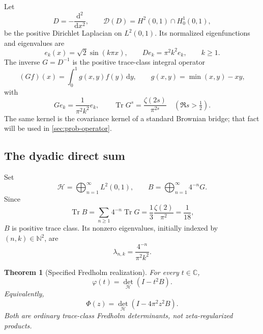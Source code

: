 \documentclass[11pt,oneside]{article}
\newtheorem{theorem}{Theorem}[section]
\theoremstyle{definition}
\newcommand{\dd}{\,\mathrm d}
\newcommand{\C}{\mathbb C}
\newcommand{\N}{\mathbb N}
\newcommand{\Tr}{\operatorname{Tr}}
\newcommand{\PhiF}{\Phi}
\newcommand{\phiF}{\varphi}
\begin{document}
Let
\begin{equation}
 D=-\frac{\mathrm d^2}{\mathrm dx^2},
 \qquad
 \mathcal D(D)=H^2(0,1)\cap H_0^1(0,1),
 \label{eq:Dirichlet-D}
\end{equation}
be the positive Dirichlet Laplacian on \(L^2(0,1)\).  Its normalized eigenfunctions and
eigenvalues are
\begin{equation}
 e_k(x)=\sqrt2\sin(k\pi x),
 \qquad
 De_k=\pi^2k^2e_k,
 \qquad k\ge1.
 \label{eq:D-spectrum}
\end{equation}
The inverse \(G=D^{-1}\) is the positive trace-class integral operator
\begin{equation}
 (Gf)(x)=\int_0^1g(x,y)f(y)\dd y,
 \qquad
 g(x,y)=\min(x,y)-xy,
 \label{eq:Green-kernel}
\end{equation}
with
\begin{equation}
 Ge_k=\frac1{\pi^2k^2}e_k,
 \qquad
 \Tr G^s=\frac{\zeta(2s)}{\pi^{2s}}
 \quad(\Re s>\tfrac12).
 \label{eq:G-zeta}
\end{equation}
The same kernel is the covariance kernel of a standard Brownian bridge; that fact will
be used in \cref{sec:prob-operator}.

\subsection{The dyadic direct sum}

Set
\begin{equation}
 \mathscr H=\bigoplus_{n=1}^{\infty}L^2(0,1),
 \qquad
 B=\bigoplus_{n=1}^{\infty}4^{-n}G.
 \label{eq:B-definition}
\end{equation}
Since
\begin{equation}
 \Tr B=\sum_{n\ge1}4^{-n}\Tr G
 =\frac13\frac{\zeta(2)}{\pi^2}=\frac1{18},
 \label{eq:B-trace}
\end{equation}
\(B\) is positive trace class.  Its nonzero eigenvalues, initially indexed by
\((n,k)\in\N^2\), are
\begin{equation}
 \lambda_{n,k}=\frac{4^{-n}}{\pi^2k^2}.
 \label{eq:B-double-spectrum}
\end{equation}

\begin{theorem}[Specified Fredholm realization]
\label{thm:Fredholm}
For every \(t\in\C\),
\begin{equation}
 \boxed{\quad
 \phiF(t)=\det_{\mathscr H}(I-t^2B).
 \quad}
 \label{eq:Fredholm-phi}
\end{equation}
Equivalently,
\begin{equation}
 \PhiF(z)=\det_{\mathscr H}(I-4\pi^2z^2B).
 \label{eq:Fredholm-Phi}
\end{equation}
Both are ordinary trace-class Fredholm determinants, not zeta-regularized products.
\end{theorem}
\end{document}
